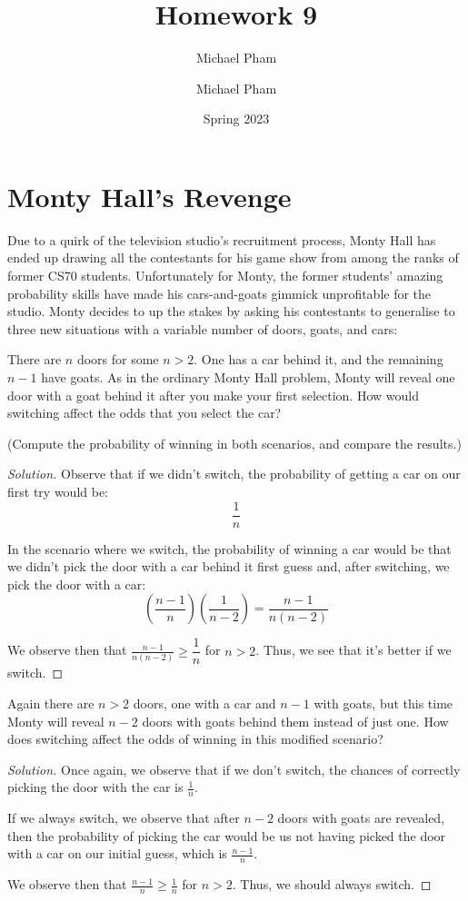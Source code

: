 \documentclass{article}
\title{#1}
\author{Michael Pham}
\date{#2}
\newenvironment{solution}{\begin{proof}[Solution]}{\end{proof}}
\newcommand{\mytitle}[2]{%
	\title{#1}
	\author{Michael Pham}
	\date{#2}
	\maketitle
	\newpage
	\tableofcontents
	\newpage
}
\begin{document}
\mytitle{Homework 9}{Spring 2023}

\section{Monty Hall's Revenge}
Due to a quirk of the television studio's recruitment process, Monty Hall has
ended up drawing all the contestants for his game show from among the ranks of
former CS70 students. Unfortunately for Monty, the former students' amazing
probability skills have made his cars-and-goats gimmick unprofitable for the
studio. Monty decides to up the stakes by asking his contestants to generalise
to three new situations with a variable number of doors, goats, and cars:

\begin{hw}
	There are $n$ doors for some $n > 2$. One has a car behind it, and the
	remaining $n-1$ have goats. As in the ordinary Monty Hall problem, Monty will reveal one door with a goat behind it after you make your first selection. How would switching affect the odds that you select the car?
	
	(Compute the probability of winning in both scenarios, and compare the results.)
\end{hw}
\begin{solution}
	Observe that if we didn't switch, the probability of getting a car on our first try would be:
	\begin{equation*}
		\dfrac{1}{n}
	\end{equation*}
	
	In the scenario where we switch, the probability of winning a car would be that we didn't pick the door with a car behind it first guess and, after switching, we pick the door with a car:
	\begin{equation*}
		\left( \dfrac{n-1}{n} \right)( \dfrac{1}{n-2}) = \dfrac{n-1}{n(n-2)}
	\end{equation*}

	We observe then that $\frac{n-1}{n(n-2)} \geq \dfrac{1}{n}$ for $n > 2$. Thus, we see that it's better if we switch.
\end{solution}

\begin{hw}
	Again there are $n > 2$ doors, one with a car and $n-1$ with goats, but
	this time Monty will reveal $n-2$ doors with goats behind them instead
	of just one. How does switching affect the odds of winning in this
	modified scenario?
\end{hw}
\begin{solution}
	Once again, we observe that if we don't switch, the chances of correctly picking the door with the car is $\frac{1}{n}$.
	
	If we always switch, we observe that after $n-2$ doors with goats are revealed, then the probability of picking the car would be us not having picked the door with a car on our initial guess, which is $\frac{n-1}{n}$.
	
	We observe then that $\frac{n-1}{n} \geq \frac{1}{n}$ for $n > 2$. Thus, we should always switch.
\end{solution}
\end{document}

